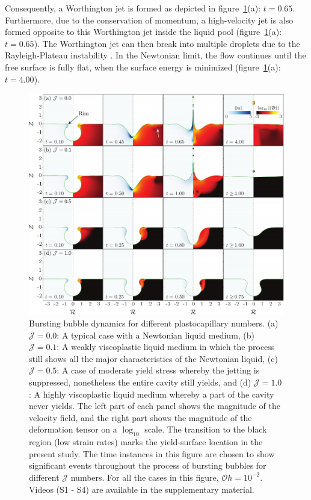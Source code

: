 \documentclass[final]{jfm}
\begin{document}
Consequently, a Worthington jet is formed as depicted in figure~\ref{fig:J_Variation}(a): $t = 0.65$. Furthermore, due to the conservation of momentum, a high-velocity jet is also formed opposite to this Worthington jet inside the liquid pool (figure~\ref{fig:J_Variation}(a): $t = 0.65$). The Worthington jet can then break into multiple droplets due to the Rayleigh-Plateau instability \citep{walls2015jet}. In the Newtonian limit, the flow continues until the free surface is fully flat, when the surface energy is minimized (figure~\ref{fig:J_Variation}(a): $t = 4.00$).
 \begin{figure}
	\centerline{\includegraphics[width=\linewidth]{Figures/Figure2_Jvariation-eps-converted-to.pdf}}%
	\caption{Bursting bubble dynamics for different plastocapillary numbers. (a) $\mathcal{J} = 0.0$: A typical case with a Newtonian liquid medium, (b) $\mathcal{J} =0.1$: A weakly viscoplastic liquid medium in which the process still shows all the major characteristics of the Newtonian liquid, (c) $\mathcal{J} = 0.5$: A case of moderate yield stress whereby the jetting is suppressed, nonetheless the entire cavity still yields, and (d) $\mathcal{J} = 1.0$: A highly viscoplastic liquid medium whereby a part of the cavity never yields. The left part of each panel shows the magnitude of the velocity field, and the right part shows the magnitude of the deformation tensor on a $\log_{10}$ scale. The transition to the black region (low strain rates) marks the yield-surface location in the present study. The time instances in this figure are chosen to show significant events throughout the process of bursting bubbles for different $\mathcal{J}$ numbers. For all the cases in this figure, $\mathcal{O}h = 10^{-2}$. Videos (S1 - S4) are available in the supplementary material.}
	\label{fig:J_Variation}
\end{figure}
\end{document}
